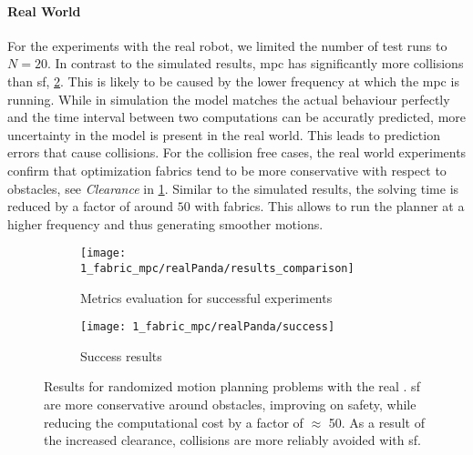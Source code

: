 \paragraph{Real World}
For the experiments with the real robot, we limited the number of test runs to $N=20$. In
contrast to the simulated results, \ac{mpc} has significantly more collisions than
\ac{sf}, \cref{subfig:experiment1_realPanda_success}.  This is likely to be caused by the
lower frequency at which the \ac{mpc} is running. While in simulation the model matches
the actual behaviour perfectly and the time interval between two computations can be
accuratly predicted, more uncertainty in the model is present in the real world. This
leads to prediction errors that cause collisions.  For the collision free cases, the real
world experiments confirm that optimization fabrics tend to be more conservative with
respect to obstacles, see \textit{Clearance} in \cref{subfig:experiment1_realPanda_res}.
Similar to the simulated results, the solving time is reduced by a factor of around $50$
with fabrics. This
allows to run the planner at a higher frequency and thus generating smoother motions.

\begin{figure}[h]
  \centering
  \begin{subfigure}{\linewidth}
    \centering
    \texttt{[image: 1\_fabric\_mpc/realPanda/results\_comparison]}
    \caption{Metrics evaluation for successful experiments}%
    \label{subfig:experiment1_realPanda_res}
  \end{subfigure}
  \begin{subfigure}{\linewidth}
    \centering
    \texttt{[image: 1\_fabric\_mpc/realPanda/success]}
    \caption{Success results}%
    \label{subfig:experiment1_realPanda_success}
  \end{subfigure}
  \caption{Results for randomized motion planning problems with the real \panda{}.
    \ac{sf} are more conservative around obstacles, improving on safety, while
    reducing the computational cost by a factor of $\approx$ 50.
    As a result of the increased clearance, collisions are more reliably avoided with
    \ac{sf}.
  }%
  \label{fig:experiment1_realPanda}
\end{figure}

